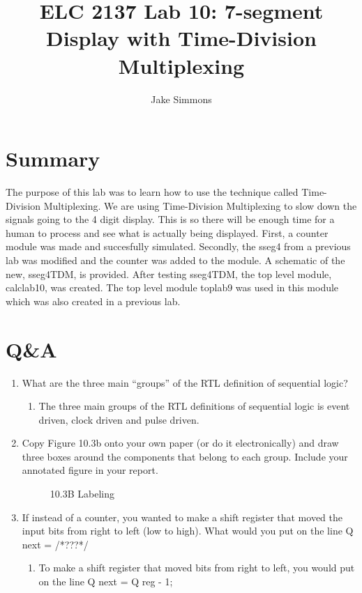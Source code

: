 \documentclass[11pt]{article}
\begin{document}
\title{ELC 2137 Lab 10: 7-segment Display with Time-Division Multiplexing}
\author{Jake Simmons}

\maketitle


\section*{Summary}

The purpose of this lab was to learn how to use the technique called Time-Division Multiplexing. We are using Time-Division Multiplexing to slow down the signals going to the 4 digit display. This is so there will be enough time for a human to process and see what is actually being displayed. First, a counter module was made and succesfully simulated. Secondly, the sseg4 from a previous lab was modified and the counter was added to the module. A schematic of the new, sseg4TDM, is provided. After testing sseg4TDM, the top level module, calclab10, was created. The top level module toplab9 was used in this module which was also created in a previous lab.  

\clearpage
\section*{Q\&A}

\begin{enumerate}
		\item What are the three main “groups” of the RTL deﬁnition of sequential logic?
		\begin{enumerate}
			\item 	The three main groups of the RTL definitions of sequential logic is event driven, clock driven and pulse driven. 
		\end{enumerate}
	
	\item Copy Figure 10.3b onto your own paper (or do it electronically) and draw three boxes around the components that belong to each group. Include your annotated ﬁgure in your report.
	
	\begin{figure}[ht]\centering
		\caption{10.3B Labeling}
		\label{fig:picture}
	\end{figure}

	\item If instead of a counter, you wanted to make a shift register that moved the input bits from right to left (low to high). What would you put on the line Q next = /*???*/
	\begin{enumerate}
		\item To make a shift register that moved bits from right to left, you would put on the line Q next = Q reg - 1;
	\end{enumerate}
\end{enumerate}
\end{document}

